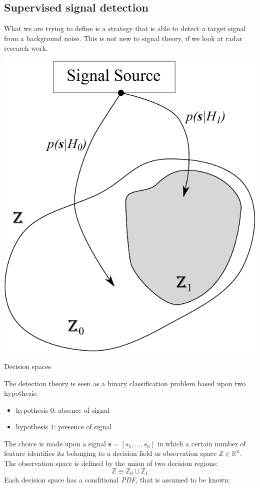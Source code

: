 \subsection{Supervised signal detection}
What we are trying to define is a strategy that is able to detect a target signal from a background noise. This is not new to signal theory, if we look at radar research work.
\begin{marginfigure}
	\centering
	\includegraphics[scale=0.5]{ch3/img/signalsources.pdf}
	\caption{Decision spaces}
\end{marginfigure}
The detection theory is seen as a binary classification problem based upon two hypothesis:
\begin{itemize}
\item hypothesis $0$: absence of signal
\item hypothesis $1$: presence of signal
\end{itemize}
The choice is made upon a signal ${\mathbf{s} = [s_1,\dots,s_n]}$ in which a certain number of feature identifies its belonging to a decision field or observation space $\mathbb{Z} \in \mathbb{R}^n$. The observation space is defined by the union of two decision regions:
\[ \mathbb{Z} \equiv \mathbb{Z}_0 \cup \mathbb{Z}_1 \]
Each decision space has a conditional \emph{PDF}, that is assumed to be known:

